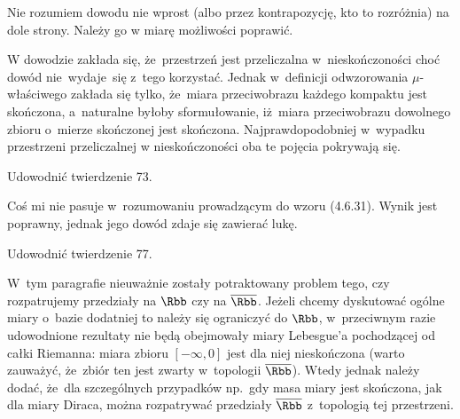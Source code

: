 \documentclass[a4paper,11pt]{article}
\numberwithin{equation}{section}
\begin{document}
\VerSpaceFour





\noindent
{} Nie rozumiem dowodu nie wprost (albo przez
kontrapozycję, kto to rozróżnia) na dole strony. Należy go w miarę
możliwości poprawić.

\VerSpaceFour





\noindent
{} W dowodzie zakłada się, że~przestrzeń jest
przeliczalna w~nieskończoności choć dowód nie~wydaje~się z~tego
korzystać. Jednak w~definicji odwzorowania $\mu$-właściwego
zakłada się tylko, że~miara przeciwobrazu każdego kompaktu jest
skończona, a~naturalne byłoby sformułowanie, iż~miara przeciwobrazu
dowolnego zbioru o~mierze skończonej jest skończona.
Najprawdopodobniej w~wypadku przestrzeni przeliczalnej w
nieskończoności oba te pojęcia pokrywają się.

\VerSpaceFour





\VerSpaceFour
{} Udowodnić twierdzenie 73.

\VerSpaceFour





\noindent
{} Coś mi nie pasuje w~rozumowaniu prowadzącym do wzoru
(4.6.31). Wynik jest poprawny, jednak jego dowód zdaje się zawierać
lukę.

\VerSpaceFour





\noindent
{} Udowodnić twierdzenie 77.

\VerSpaceFour





\noindent
{} W~tym paragrafie nieuważnie zostały potraktowany
problem tego, czy rozpatrujemy przedziały na $\Rbb$ czy na
$\overline{\Rbb}$. Jeżeli chcemy dyskutować ogólne miary o~bazie
dodatniej to należy się ograniczyć do $\Rbb$, w~przeciwnym razie
udowodnione rezultaty nie będą obejmowały miary Lebesgue'a pochodzącej
od całki Riemanna: miara zbioru $[ -\infty, 0 ]$ jest dla niej
nieskończona (warto zauważyć, że~zbiór ten jest zwarty w~topologii
$\overline{\Rbb}$). Wtedy jednak należy dodać, że~dla szczególnych
przypadków np.~gdy masa miary jest skończona, jak dla miary Diraca,
można rozpatrywać przedziały $\overline{\Rbb}$ z~topologią tej
przestrzeni.
\end{document}

